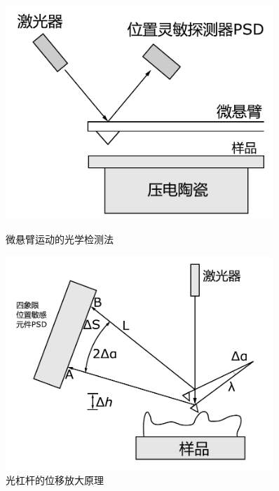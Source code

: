\documentclass[a4paper]{article}
\begin{document}
\begin{figure}[!h]
\begin{minipage}{0.48\textwidth}
\begin{center}
\includegraphics[width=0.9\textwidth]{fig/fig3.pdf}
\caption{微悬臂运动的光学检测法}\label{fig3}
\end{center}
\end{minipage}
\begin{minipage}{0.48\textwidth}
\includegraphics[width=0.9\textwidth]{fig/fig4.pdf}
\caption{光杠杆的位移放大原理}\label{fig4}
\end{minipage}
\end{figure}
\end{document}
